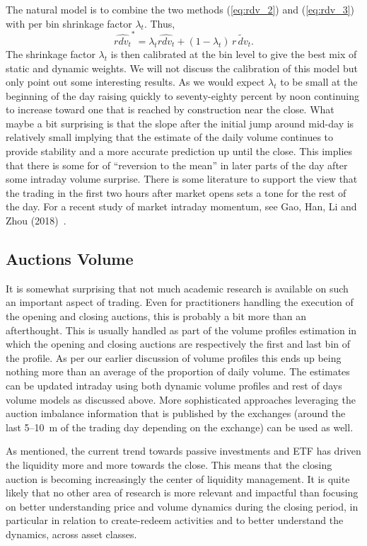 The natural  model is to combine the two methods (\ref{eq:rdv_2}) and (\ref{eq:rdv_3}) with per bin shrinkage factor $\lambda_t$. Thus,
	\begin{equation}\label{eq:rdv_4}
	\widehat{rdv_t}^* = \lambda_t \widehat{rdv_t} + (1-\lambda_t)\, \widetilde{r\, dv_t}.
	\end{equation}
The shrinkage factor $\lambda_t$ is then calibrated at the bin level to give the best mix of static and dynamic weights. We will not discuss the calibration of this model but only point out some interesting results. As we would expect $\lambda_t$ to be small at the beginning of the day raising quickly to seventy-eighty percent by noon continuing to increase toward one that is reached by construction near the close. What maybe a bit surprising is that the slope after the initial jump around mid-day is relatively small implying that the estimate of the daily volume continues to provide stability and a more accurate prediction up until the close. This implies that there is some for of ``reversion to the mean'' in later parts of the day after some intraday volume surprise. There is some literature to support the view that the trading in the first two hours after market opens sets a tone for the rest of the day. For a recent study of market intraday momentum, see Gao, Han, Li and Zhou (2018)~\cite{ghliz}.



\subsection{Auctions Volume}

It is somewhat surprising that not much academic research is available on such an important aspect of trading. Even for practitioners handling the execution of the opening and closing auctions, this is probably a bit more than an afterthought. This is usually handled as part of the volume profiles estimation in which the opening and closing auctions are respectively the first and last bin of the profile. As per our earlier discussion of volume profiles this ends up being nothing more than an average of the proportion of daily volume. The estimates can be updated  intraday using both dynamic volume profiles and rest of days volume models as discussed above. More sophisticated approaches leveraging the auction imbalance information that is published by the exchanges (around the last 5--10~m of the trading day depending on the exchange) can be used as well.


As mentioned, the current trend towards passive investments and ETF has driven the liquidity more and more towards the close. This means that the closing auction is becoming increasingly the center of liquidity management.  It is quite likely that no other area of research is more relevant and impactful than focusing on better understanding price and volume dynamics during the closing period, in particular in relation to create-redeem activities and to better understand the dynamics, across asset classes.



